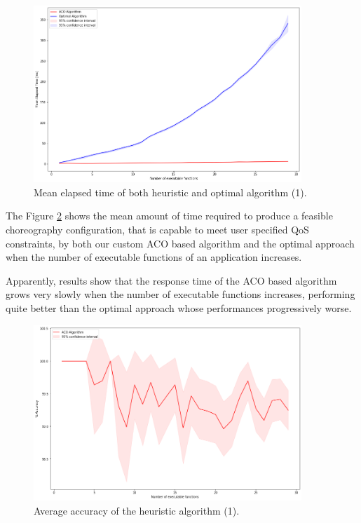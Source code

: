 \documentclass[12pt,a4paper]{report}
\begin{document}
\begin{figure}[h]
	\centering
	\includegraphics[width=0.9\textwidth]{./experiments/ACOvsOptimalIncreasingExecutable.png}
	\caption{Mean elapsed time of both heuristic and optimal algorithm (1).}%
	\label{ACOvsOptimalIncreasingExecutable}
\end{figure}

The Figure \ref{ACOvsOptimalIncreasingExecutable} shows the mean amount of time required to produce a feasible choreography configuration, that is capable to meet user specified QoS constraints, by both our custom ACO based algorithm and the optimal approach when the number of executable functions of an application increases. 

Apparently, results show that the response time of the ACO based algorithm grows very slowly when the number of executable functions increases, performing quite better than the optimal approach whose performances progressively worse.

\begin{figure}[h]
	\centering
	\includegraphics[width=0.9\textwidth]{./experiments/ACOvsOptimalAccuracyIncreasingExecutable.png}
	\caption{Average accuracy of the heuristic algorithm (1).}%
	\label{ACOvsOptimalIncreasingExecutable}
\end{figure}
\end{document}
